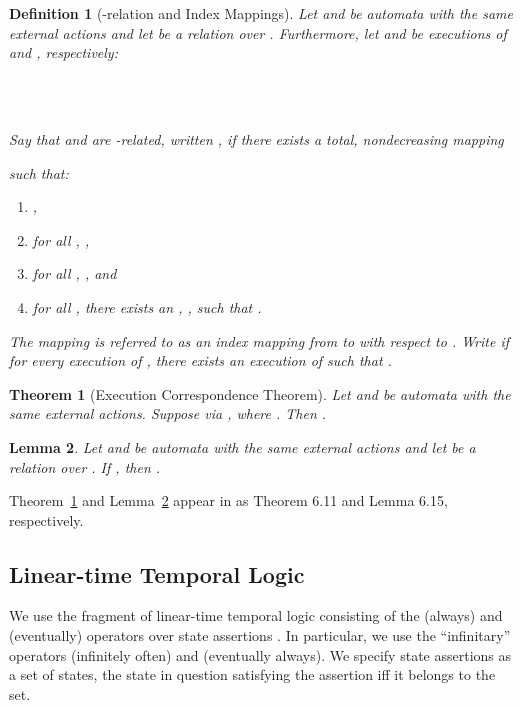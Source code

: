 \documentclass[11pt]{article}
\newcommand{\bn}{\begin{enumerate}}
\newcommand{\en}{\end{enumerate}}
\newcommand{\bl}{\begin{lemma}}
\newcommand{\el}{\end{lemma}}
\newcommand{\bt}{\begin{theorem}}
\newcommand{\et}{\end{theorem}}
\newcommand{\bd}{\begin{definition}}
\newcommand{\ed}{\end{definition}}
\newcommand{\intrdef}{\emph}	\newcommand{\intr}{\emph}
\newtheorem{theorem}{Theorem}
\newtheorem{lemma}[theorem]{Lemma}
\newtheorem{definition}{Definition}
\newcommand{\ms}[1]{\relax\ifmmode
                \mathord{\mathcode`\-="702D\it #1\mathcode`\-="2200}\else
{\it #1}\fi
}
\begin{document}
\bd[-relation and Index Mappings]
Let  and  be automata with the same external actions and let 
be a relation over . Furthermore, let
 and  be executions of  and , respectively:
\ms\\
\ind  \\
\ind  \ms\\
Say that  and  are \intrdef{-related}, written
, if there exists a total, nondecreasing mapping

such that:
\bn
   \item \label{clause:index-mapping:init} ,

   \item \label{clause:index-mapping:corr}
          for all , ,

   \item \label{clause:index-mapping:trace}
          for all 
               , , and



   \item \label{clause:index-mapping:cofinal}
         for all , there exists an , 
             , such that .
\en
The mapping  is referred to as an \intrdef{index mapping} from
 to  with respect to .
Write  if for every execution  of , there
exists an execution  of  such that .
\label{def:index-mapping}
\ed






\bt [Execution Correspondence Theorem]
Let  and  be automata with the same external actions.
Suppose  via , where .
Then .
\label{thm:execution-correspondence}
\et




\bl  
Let  and  be automata with the same external actions and let 
be a relation over . If , then .
\label{lem:traces}
\el


Theorem~\ref{thm:execution-correspondence} and Lemma~\ref{lem:traces} appear
in \cite{GSSL93} as Theorem 6.11 and Lemma 6.15, respectively.




\subsection{Linear-time Temporal Logic}

We use the fragment of linear-time temporal
logic consisting of the  (always) and
 (eventually) operators over state assertions \cite{Pn77,MP92}.
In particular, we use the ``infinitary'' operators  (infinitely often)
and  (eventually always).
We specify state assertions as a set of states, the state in question
satisfying the assertion iff it belongs to the set.
\end{document}
